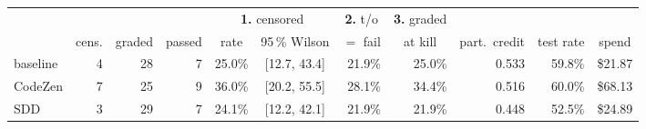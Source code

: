 
\begin{tabular}{@{}lrrrrcrrrrr@{}}
\toprule
 & & & & \multicolumn{2}{c}{\textbf{1.} censored} & \multicolumn{1}{c}{\textbf{2.} t/o} &
 \multicolumn{1}{c}{\textbf{3.} graded} & & & \\
\cmidrule(lr){5-6}\cmidrule(lr){7-7}\cmidrule(lr){8-8}
 & \multicolumn{1}{c}{cens.} & \multicolumn{1}{c}{graded} &
 \multicolumn{1}{c}{passed} & \multicolumn{1}{c}{rate} & \multicolumn{1}{c}{95\,\% Wilson} &
 \multicolumn{1}{c}{$=$ fail} & \multicolumn{1}{c}{at kill} &
 \multicolumn{1}{c}{part.\ credit} &
 \multicolumn{1}{c}{test rate} & \multicolumn{1}{c}{spend} \\
\midrule
baseline & 4 & 28 & 7 & 25.0\% & [12.7, 43.4] & 21.9\% & 25.0\% & 0.533 & 59.8\% & \$21.87 \\
CodeZen & 7 & 25 & 9 & 36.0\% & [20.2, 55.5] & 28.1\% & 34.4\% & 0.516 & 60.0\% & \$68.13 \\
SDD & 3 & 29 & 7 & 24.1\% & [12.2, 42.1] & 21.9\% & 21.9\% & 0.448 & 52.5\% & \$24.89 \\
\bottomrule
\end{tabular}
